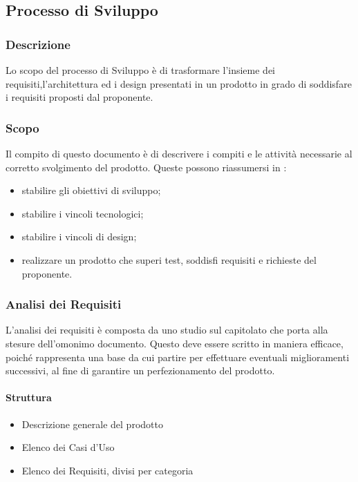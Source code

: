 \subsection{Processo di Sviluppo}
	\subsubsection{Descrizione}
		Lo scopo del processo di Sviluppo è di trasformare l'insieme dei requisiti,l'architettura ed i design presentati in un prodotto in grado di soddisfare i requisiti proposti dal proponente.
		
		
	\subsubsection{Scopo}
		Il compito di questo documento è di descrivere i compiti e le attività necessarie al corretto svolgimento del prodotto. Queste possono riassumersi in :
		\begin{itemize}
			\item stabilire gli obiettivi di sviluppo;
			\item stabilire i vincoli tecnologici;
			\item stabilire i vincoli di design;
			\item realizzare un prodotto che superi test, soddisfi requisiti e richieste del proponente.
		\end{itemize}
	
	\subsubsection{Analisi dei Requisiti}
		L'analisi dei requisiti è composta da uno studio sul capitolato che porta alla stesure dell'omonimo documento. Questo deve essere scritto in maniera efficace, poiché rappresenta una base da cui partire per effettuare eventuali miglioramenti successivi, al fine di garantire un perfezionamento del prodotto. 
		
		\paragraph{Struttura} 
		\begin{itemize}
			\item Descrizione generale del prodotto
			\item Elenco dei Casi d'Uso
			\item Elenco dei Requisiti, divisi per categoria
		\end{itemize}
	
